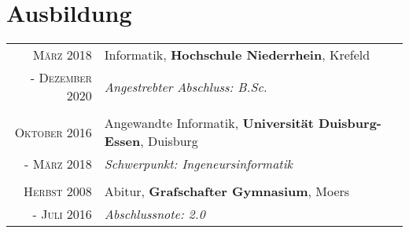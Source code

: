 \documentclass[10pt,a4paper]{article}
\begin{document}
\section{Ausbildung}

\begin{tabular}{r|p{11cm}}
	
	\textsc{M\"arz} 2018		& Informatik, \textbf{Hochschule Niederrhein}, Krefeld \\
	- \textsc{Dezember 2020}	& \emph{Angestrebter Abschluss: B.Sc.} \\
	\multicolumn{2}{c}{} \\
	
	\textsc{Oktober} 2016	& Angewandte Informatik, \textbf{Universit\"at Duisburg-Essen}, Duisburg \\
	- \textsc{M\"arz} 2018	& \emph{Schwerpunkt: Ingeneursinformatik} \\
	\multicolumn{2}{c}{} \\
	
	\textsc{Herbst} 2008		& Abitur, \textbf{Grafschafter Gymnasium}, Moers \\
	- \textsc{Juli} 2016		& \emph{Abschlussnote: 2.0} \\
\end{tabular} \\

\newpage


%
%
%
\nocite{*}
\printbibliography[title={Publikationen}]
\end{document}
